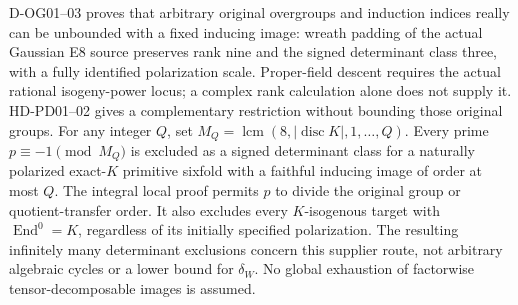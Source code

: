 \documentclass[11pt]{article}
\theoremstyle{remark}\newtheorem{remark}[theorem]{Remark}
\begin{document}
D-OG01--03 proves that arbitrary original overgroups and induction
indices really can be unbounded with a fixed inducing image: wreath
padding of the actual Gaussian E8 source preserves rank nine and the
signed determinant class three, with a fully identified polarization
scale. Proper-field descent requires the actual rational isogeny-power
locus; a complex rank calculation alone does not supply it.
HD-PD01--02 gives a complementary restriction without bounding those
original groups. For any integer $Q$, set
$M_Q=\operatorname{lcm}(8,|\operatorname{disc}K|,1,\ldots,Q)$.
Every prime $p\equiv-1\pmod{M_Q}$ is excluded as a signed determinant
class for a naturally polarized exact-$K$ primitive sixfold with a
faithful inducing image of order at most $Q$.
The integral local proof permits $p$ to divide the original group or
quotient-transfer order. It also excludes every $K$-isogenous target
with $\operatorname{End}^0=K$, regardless of its initially specified
polarization. The resulting infinitely many determinant exclusions
concern this supplier route, not arbitrary algebraic cycles or a lower
bound for $\delta_W$. No global exhaustion of factorwise tensor-decomposable
images is assumed.
\end{document}
